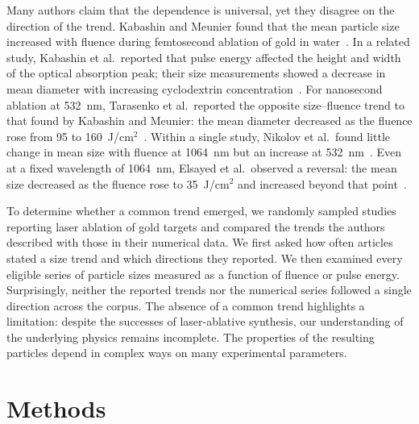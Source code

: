 \documentclass[english]{ai4science_ysda}
\begin{document}
{Many authors claim that the dependence is universal, yet they disagree on the
direction of the trend.
Kabashin and Meunier found that the mean particle size increased with fluence
during femtosecond ablation of gold in water~\cite{kabashin2003}. In a related
study, Kabashin et al.\ reported that pulse energy affected the height and
width of the optical absorption peak; their size measurements showed a decrease
in mean diameter with increasing cyclodextrin concentration~\cite{kabashin2003cd}.
For nanosecond ablation at 532~nm, Tarasenko et al.\ reported the opposite
size--fluence trend to that found by Kabashin and Meunier: the mean diameter
decreased as the fluence rose from 95 to 160~J/cm$^2$~\cite{tarasenko2006}.
Within a single study, Nikolov
et al.\ found little change in mean size with fluence at 1064~nm but an
increase at 532~nm~\cite{nikolov2011}. Even at a fixed wavelength of
1064~nm, Elsayed et al.\ observed a reversal: the mean size decreased as
the fluence rose to 35~J/cm$^2$ and increased beyond that
point~\cite{elsayed2013}.

To determine whether a common trend emerged, we randomly sampled studies
reporting laser ablation of gold targets and compared the trends the authors
described with those in their numerical data. We first asked how often
articles stated a size trend and which directions they reported. We then
examined every eligible series of particle sizes measured as a function of
fluence or pulse energy. Surprisingly, neither the reported
trends nor the numerical series followed a single direction across the corpus.
The absence of a common trend highlights a limitation: despite the successes
of laser-ablative synthesis, our understanding of the underlying physics
remains incomplete. The properties of the resulting particles depend in complex
ways on many experimental parameters.}

\section{Methods}
\end{document}
